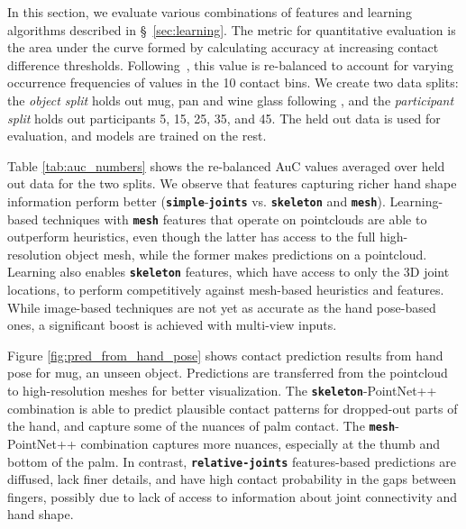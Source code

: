 \documentclass[runningheads]{llncs}
\begin{document}
In this section, we evaluate various combinations of features and learning algorithms described in \S~\ref{sec:learning}. The metric for quantitative evaluation is the area under the curve formed by calculating accuracy at increasing contact difference thresholds. Following~\cite{zhang2016colorful}, this value is re-balanced to account for varying occurrence frequencies of values in the 10 contact bins. We create two data splits: the \emph{object split} holds out mug, pan and wine glass following \cite{contactdbv1}, and the \emph{participant split} holds out participants 5, 15, 25, 35, and 45. The held out data is used for evaluation, and models are trained on the rest.

Table \ref{tab:auc_numbers} shows the re-balanced AuC values averaged over held out data for the two splits. We observe that features capturing richer hand shape information perform better (\eg \texttt{\textbf{simple}}-\texttt{\textbf{joints}} vs. \texttt{\textbf{skeleton}} and \texttt{\textbf{mesh}}). Learning-based techniques with \texttt{\textbf{mesh}} features that operate on pointclouds are able to outperform heuristics, even though the latter has access to the full high-resolution object mesh, while the former makes predictions on a pointcloud. Learning also enables \texttt{\textbf{skeleton}} features, which have access to only the 3D joint locations, to perform competitively against mesh-based heuristics and features. While image-based techniques are not yet as accurate as the hand pose-based ones, a significant boost is achieved with multi-view inputs.



Figure \ref{fig:pred_from_hand_pose} shows contact prediction results from hand pose for mug, an unseen object. Predictions are transferred from the pointcloud to high-resolution meshes for better visualization. The \textbf{\texttt{skeleton}}-PointNet++ combination is able to predict plausible contact patterns for dropped-out parts of the hand, and capture some of the nuances of palm contact. The \textbf{\texttt{mesh}}-PointNet++ combination captures more nuances, especially at the thumb and bottom of the palm. In contrast, \textbf{\texttt{relative-joints}} features-based predictions are diffused, lack finer details, and have high contact probability in the gaps between fingers, possibly due to lack of access to information about joint connectivity and hand shape.
\end{document}
